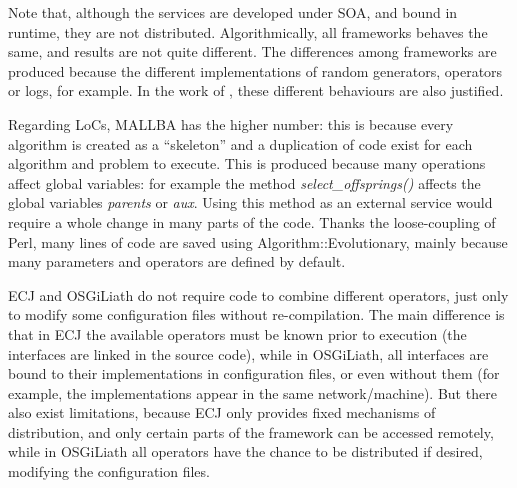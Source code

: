  Note that, although the services are developed under SOA, and
bound in runtime, they are not distributed. Algorithmically, all
frameworks behaves the same, and results are not quite different. The
differences among frameworks are produced because the different
implementations of random generators, operators or logs, for
example. In the work of  \cite{PERL}, these
different behaviours are also justified. %



Regarding LoCs, MALLBA has the higher number: this is because every
algorithm is created as a ``skeleton'' and a duplication of code exist
for each algorithm and problem to execute. This is produced because
many operations affect global variables: for example the method {\em
  select\_offsprings()} affects the global variables {\em parents} or
{\em aux}. Using this method as an external service would require a
whole change in many parts of the code. Thanks the loose-coupling of
Perl, many lines of code are saved using Algorithm::Evolutionary,
mainly because many parameters and operators are defined by default. 



ECJ and OSGiLiath do not require code to combine different operators, just
only to modify some configuration files without re-compilation. %
The main difference is that in ECJ the available operators must be known prior
to execution (the interfaces are linked in the source code), while in
OSGiLiath, all interfaces are bound to their implementations in configuration files, or even
without them (for example, the implementations appear in the same network/machine). But
there also exist limitations, because ECJ only provides  fixed mechanisms
of distribution, and only certain parts of the framework
can be accessed remotely, while in OSGiLiath all operators have the
chance to be distributed if desired, modifying the configuration
files. 



